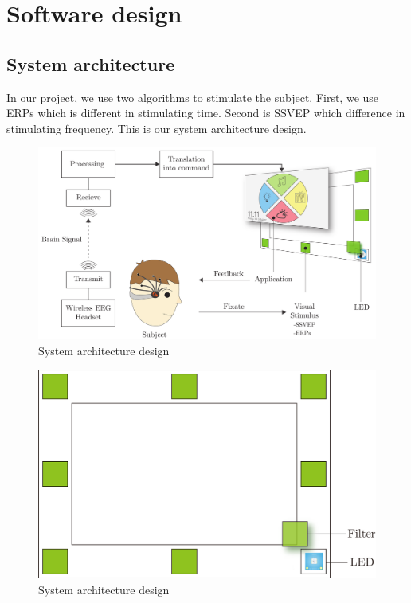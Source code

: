 \chapter{Software design}

\label{ch:Software design}

\setlength{\parindent}{4em}
\setlength{\parskip}{1em}
\renewcommand{\baselinestretch}{1.5}

\section{System architecture}

\hspace{1.5cm}In our project, we use two algorithms to stimulate the subject. First, we use ERPs which is different in stimulating time. Second is SSVEP which difference in stimulating frequency. This is our system architecture design.

\begin{figure}[ht]
	\centering
	\includegraphics[scale = 0.28]{chapter5/architec.pdf}
	\caption{System architecture design}
\end{figure}

\begin{figure}[ht]
	\centering
	\includegraphics[scale = 0.5]{chapter5/frame_led.pdf}
	\caption{System architecture design}
\end{figure}

